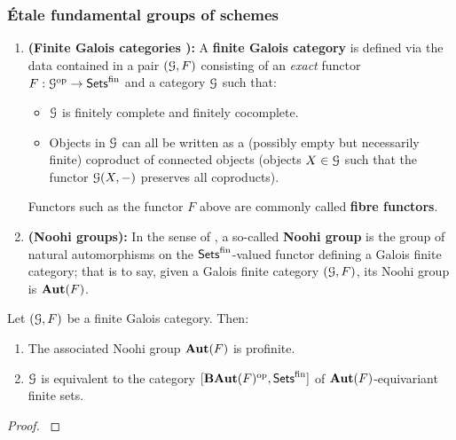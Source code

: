             \subsubsection{\'Etale fundamental groups of schemes}
                \begin{definition} \label{def: fintie_galois_categories}
                    \noindent
                    \begin{enumerate}
                        \item \textbf{(Finite Galois categories \cite[\href{https://stacks.math.columbia.edu/tag/0BMY}{Tag 0BMY}]{stacks}):} A \textbf{finite Galois category} is defined via the data contained in a pair $(\mathcal{G}, F)$ consisting of an \textit{exact} functor $F: \mathcal{G}^{\mathrm{op}} \to \mathsf{Sets}^{\mathrm{fin}}$ and a category $\mathcal{G}$ such that:
                            \begin{itemize}
                                \item $\mathcal{G}$ is finitely complete and finitely cocomplete.
                                \item Objects in $\mathcal{G}$ can all be written as a (possibly empty but necessarily finite) coproduct of connected objects (objects $X \in \mathcal{G}$ such that the functor $\mathcal{G}(X, -)$ preserves all coproducts). 
                            \end{itemize}
                        Functors such as the functor $F$ above are commonly called \textbf{fibre functors}. 
                        \item \textbf{(Noohi groups):} In the sense of \cite[Theorem 2.16]{noohi_fundamental_group}, a so-called \textbf{Noohi group} is the group of natural automorphisms on the $\mathsf{Sets}^{\mathrm{fin}}$-valued functor defining a Galois finite category; that is to say, given a Galois finite category $(\mathcal{G}, F)$, its Noohi group is $\mathbf{Aut}(F)$.  
                    \end{enumerate}
                \end{definition}
                
                \begin{lemma} \label{lemma: profiniteness_of_noohi_groups}
                    Let $(\mathcal{G}, F)$ be a finite Galois category. Then:
                        \begin{enumerate}
                            \item The associated Noohi group $\mathbf{Aut}(F)$ is profinite.
                            \item $\mathcal{G}$ is equivalent to the category $[\mathbf{B}\mathbf{Aut}(F)^{\mathrm{op}}, \mathsf{Sets}^{\mathrm{fin}}]$ of $\mathbf{Aut}(F)$-equivariant finite sets.
                        \end{enumerate}
                \end{lemma}
                    \begin{proof}
                        \cite[Theorem 2.16]{noohi_fundamental_group}
                    \end{proof}
                    
